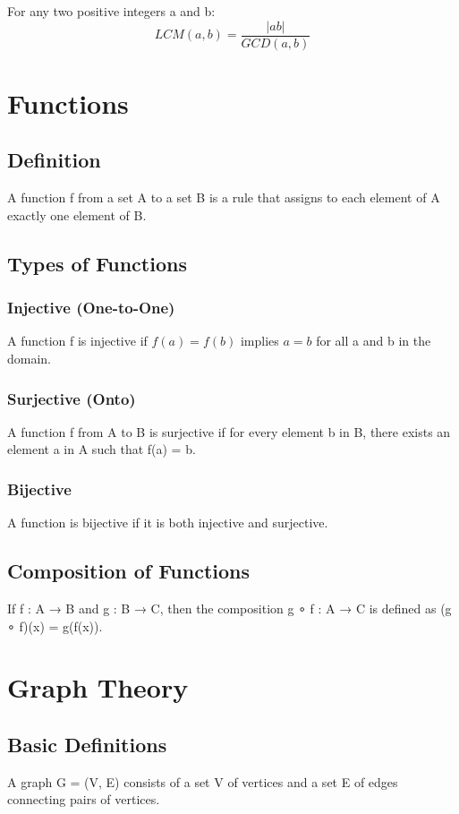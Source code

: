 \documentclass{article}
\begin{document}
\begin{theorem}
For any two positive integers a and b:
$$LCM(a,b) = \frac{|ab|}{GCD(a,b)}$$
\end{theorem}

\section{Functions}

\subsection{Definition}
A function f from a set A to a set B is a rule that assigns to each element of A exactly one element of B.

\subsection{Types of Functions}

\subsubsection{Injective (One-to-One)}
A function f is injective if $f(a) = f(b)$ implies $a = b$ for all a and b in the domain.

\subsubsection{Surjective (Onto)}
A function f from A to B is surjective if for every element b in B, there exists an element a in A such that f(a) = b.

\subsubsection{Bijective}
A function is bijective if it is both injective and surjective.

\subsection{Composition of Functions}
If f : A → B and g : B → C, then the composition g ∘ f : A → C is defined as (g ∘ f)(x) = g(f(x)).

\section{Graph Theory}

\subsection{Basic Definitions}
A graph G = (V, E) consists of a set V of vertices and a set E of edges connecting pairs of vertices.
\end{document}
